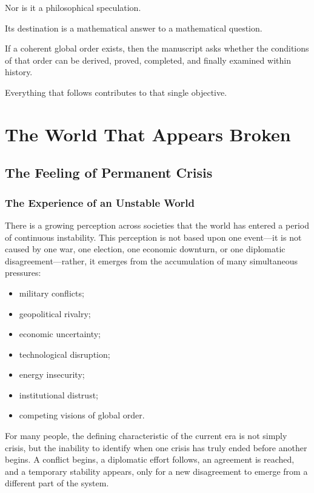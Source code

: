 \documentclass[11pt,openany]{book}
\theoremstyle{plain}
\theoremstyle{definition}
\begin{document}
Nor is it a philosophical speculation.

Its destination is a mathematical answer to a mathematical question.

If a coherent global order exists, then the manuscript asks whether the conditions of that order can be derived, proved, completed, and finally examined within history.

Everything that follows contributes to that single objective.

\mainmatter

\part{The World That Appears Broken}

\chapter{The Feeling of Permanent Crisis}

\section*{The Experience of an Unstable World}

There is a growing perception across societies that the world has entered a period of continuous instability. This perception is not based upon one event—it is not caused by one war, one election, one economic downturn, or one diplomatic disagreement—rather, it emerges from the accumulation of many simultaneous pressures:
\begin{itemize}
\item military conflicts;
\item geopolitical rivalry;
\item economic uncertainty;
\item technological disruption;
\item energy insecurity;
\item institutional distrust;
\item competing visions of global order.
\end{itemize}

For many people, the defining characteristic of the current era is not simply crisis, but the inability to identify when one crisis has truly ended before another begins. A conflict begins, a diplomatic effort follows, an agreement is reached, and a temporary stability appears, only for a new disagreement to emerge from a different part of the system.
\end{document}
